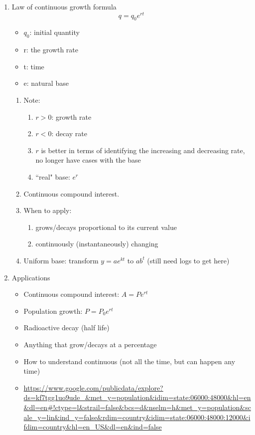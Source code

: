 \documentclass{article}
\begin{document}
\begin{enumerate}
\item Law of continuous growth formula
$$
q = q_0e^{rt}
$$
\begin{itemize}
\item $q_0$: initial quantity
\item r: the growth rate
\item t: time
\item e: natural base
\end{itemize}
\begin{enumerate}
\item Note:
\begin{enumerate}
\item $r>0$: growth rate
\item $r<0$: decay rate
\item $r$ is better in terms of identifying the increasing and decreasing rate, no longer have cases with the base
\item ``real" base: $e^r$
\end{enumerate}
\item Continuous compound interest.
\item When to apply: 
\begin{enumerate}
\item grows/decays proportional to its current value
\item continuously (instantaneously) changing 
\end{enumerate}
\item Uniform base: transform $y = ae^{kt}$ to $ab^t$ (still need logs to get here)
\end{enumerate}

\item Applications
\begin{itemize}
\item Continuous compound interest: $A=Pe^{rt}$
\item Population growth: $P=P_0e^{rt}$
\item Radioactive decay (half life)
\item Anything that grow/decays at a percentage
\item How to understand continuous (not all the time, but can happen any time)
\item \url{https://www.google.com/publicdata/explore?ds=kf7tgg1uo9ude_&met_y=population&idim=state:06000:48000&hl=en&dl=en#!ctype=l&strail=false&bcs=d&nselm=h&met_y=population&scale_y=lin&ind_y=false&rdim=country&idim=state:06000:48000:12000&ifdim=country&hl=en_US&dl=en&ind=false}
\end{itemize}
\end{enumerate}
\end{document}
